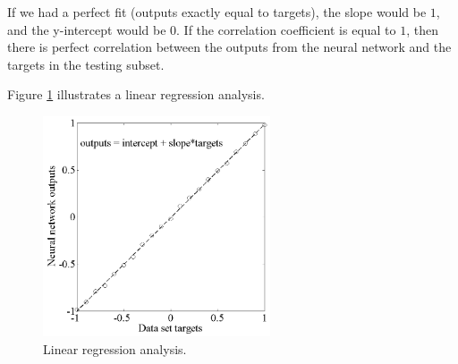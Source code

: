 If we had a perfect fit (outputs exactly equal to targets), the slope would be $1$, and the
y-intercept would be $0$. If the correlation coefficient is equal to $1$, then there is perfect correlation between
the outputs from the neural network and the targets in the testing subset. 

Figure \ref{LinearRegressionAnalysis} illustrates a linear regression analysis.  

\begin{figure}[h!]
\begin{center}
\includegraphics[width=0.6\textwidth]{function_regression/linear_regression_analysis.png}
\caption{Linear regression analysis.}\label{LinearRegressionAnalysis}
\end{center}
\end{figure}

